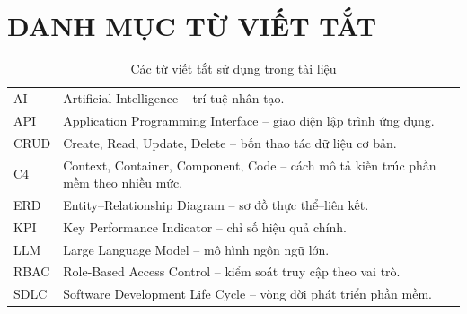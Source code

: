 \chapter*{DANH MỤC TỪ VIẾT TẮT}

\begin{table}[h!]
\centering
\small
\caption{Các từ viết tắt sử dụng trong tài liệu}\label{tab:v8-abbreviations}
\begin{tabularx}{\textwidth}{|L{2.8cm}|Y|}
\hline
{} & \\
\hline
AI & Artificial Intelligence -- trí tuệ nhân tạo.\\
\hline
API & Application Programming Interface -- giao diện lập trình ứng dụng.\\
\hline
CRUD & Create, Read, Update, Delete -- bốn thao tác dữ liệu cơ bản.\\
\hline
C4 & Context, Container, Component, Code -- cách mô tả kiến trúc phần mềm theo nhiều mức.\\
\hline
ERD & Entity--Relationship Diagram -- sơ đồ thực thể--liên kết.\\
\hline
KPI & Key Performance Indicator -- chỉ số hiệu quả chính.\\
\hline
LLM & Large Language Model -- mô hình ngôn ngữ lớn.\\
\hline
RBAC & Role-Based Access Control -- kiểm soát truy cập theo vai trò.\\
\hline
SDLC & Software Development Life Cycle -- vòng đời phát triển phần mềm.\\
\hline
\end{tabularx}
\end{table}
